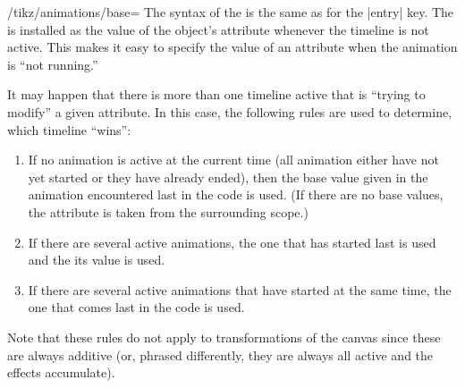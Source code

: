 \begin{key}{/tikz/animations/base=}
  The syntax of the  is the same as for the |entry|
  key. The  is installed as the value of the object's
  attribute whenever the timeline is not active. This makes it easy to
  specify the value of an attribute when the animation is ``not
  running.'' 

\begin{codeexample}[animation list={-1,0,1,2,3}]
\end{codeexample}
\end{key}


It may happen that there is more than one timeline active that is
``trying to modify'' a given attribute. In this case, the following
rules are used to determine, which timeline ``wins'':

\begin{enumerate}
\item If no animation is active at the current time (all animation
  either have not yet started or they have already ended), then the
  base value given in the animation encountered last in the code is
  used. (If there are no base values, the attribute is taken from the
  surrounding scope.)
\item If there are several active animations, the one that has started
  last is used and the its value is used.
\item If there are several active animations that have started at the
  same time, the one that comes last in the code is used.
\end{enumerate}

Note that these rules do not apply to transformations of the canvas
since these are always additive (or, phrased differently, they are
always all active and the effects accumulate).


